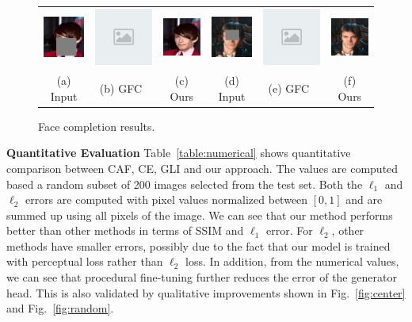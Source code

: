\begin{figure}[h!]
\begin{tabular}{cccccc}
\includegraphics[width=.16\textwidth]{figures/face/000197_input_image.png}&
\includegraphics[width=.16\textwidth]{figures/placeh.png}&
\includegraphics[width=.16\textwidth]{figures/face/000197_synthesized_image.png}&
\includegraphics[width=.16\textwidth]{figures/face/000200_input_image.png}&
\includegraphics[width=.16\textwidth]{figures/placeh.png}&
\includegraphics[width=.16\textwidth]{figures/face/000200_synthesized_image.png}\\
(a) Input & (b) GFC~\cite{li2017generative} & (c) Ours & (d) Input & (e) GFC~\cite{li2017generative} & (f) Ours \\
\end{tabular}
\caption{Face completion results.}
\label{fig:face}
\vspace{-5pt}
\end{figure}  

\noindent\textbf{Quantitative Evaluation} Table~\ref{table:numerical} shows quantitative comparison between CAF, CE, GLI and our approach. The values are computed based a random subset of 200 images selected from the test set. Both the $\ell_1$ and $\ell_2$ errors are computed with pixel values normalized between $[0,1]$ and are summed up using all pixels of the image. We can see that our method performs better than other methods in terms of SSIM and $\ell_1$ error. For $\ell_2$, other methods have smaller errors, possibly due to the fact that our model is trained with perceptual loss rather than $\ell_2$ loss. In addition, from the numerical values, we can see that procedural fine-tuning further reduces the error of the generator head. This is also validated by qualitative improvements shown in Fig.~\ref{fig:center} and Fig.~\ref{fig:random}.  

